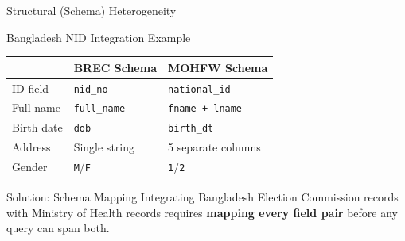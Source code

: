 \documentclass[aspectratio=169,10pt]{beamer}
\begin{document}
\begin{frame}{Structural (Schema) Heterogeneity}
  
      \begin{block}{Bangladesh NID Integration Example}
        \small
        \renewcommand{\arraystretch}{1.2}
        \begin{tabular}{lll}
          \toprule
          & \textbf{BREC Schema} & \textbf{MOHFW Schema} \\
          \midrule
          ID field   & \texttt{nid\_no}     & \texttt{national\_id} \\
          Full name  & \texttt{full\_name}  & \texttt{fname + lname} \\
          Birth date & \texttt{dob}         & \texttt{birth\_dt} \\
          Address    & Single string         & 5 separate columns \\
          Gender     & \texttt{M}/\texttt{F} & \texttt{1}/\texttt{2} \\
          \bottomrule
        \end{tabular}
      \end{block}
   \vspace{4pt}
     \begin{exampleblock}{Solution: Schema Mapping}
        Integrating Bangladesh Election Commission records with Ministry of Health records requires \textbf{mapping every field pair} before any query can span both.
            \end{exampleblock}
\end{frame}
\end{document}
